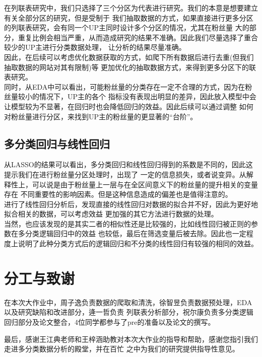 \documentclass{ctexart}
\begin{document}
在列联表研究中，我们只选择了三个分区为代表进行研究。我们的本意是想要建立有关全部分区的研究，但是受制于
我们抽取数据的方式，如果直接进行更多分区的列联表研究，会有同一个UP主同时设计多个分区的情况，尤其在粉丝量
大的部分，重复比例会相当严重，从而造成研究的结果不准确。因此我们尽量选择了重合较少的UP主进行分类数据处理，
让分析的结果尽量准确。\\
\indent 因此，在后续可以考虑优化数据获取的方式，如爬下所有数据后进行去重(但我们抽取数据的网站对其有限制)等
更加优化的抽取数据方式，来得到更多分区下的联表研究。\\
\indent 同时，从EDA中可以看出，可能粉丝量的分类存在一定不合理的方式，因为在粉丝量较小的情况下，UP主的各个
指标没有表现出明显的差异，因此放入模型中会让模型较为不显著，在回归时也会降低回归的效益。因此后续可以通过调整
如何对粉丝量进行分区，来找到UP主的粉丝量的更显著的“台阶”。

\subsection{多分类回归与线性回归}
从LASSO的结果可以看出，多分类回归和线性回归得到的系数是不同的，因此这提示我们在进行粉丝量分区处理时，出现了
一定的信息损失，或者说变异。从解释性上，可以说是由于粉丝量上一层与在全区间意义下的粉丝量的提升相关的变量存在
不同重要性的影响因素。但是这种信息造成的偏差也是值得注意的。\\
\indent 进行了线性回归分析后，发现直接的线性回归对数据的拟合并不好，因此为更好地拟合相关的数据，可以考虑效益
更加强的其它方法进行数据的处理。\\
\indent 当然，也应该发现的是其实二者的相似性还是比较强的，比如线性回归被正则的参数在多分类逻辑回归中的效益
也较低，最后在筛选变量后被去除。因此也一定程度上说明了此种分类方式后的逻辑回归和不分类的线性回归有较强的相同的效益。

\section*{分工与致谢}

在本次大作业中，周子逸负责数据的爬取和清洗，徐智昱负责数据预处理，EDA以及研究缺陷和改进部分，逄一哲负责
列联表分析部分，祝尔康负责多分类逻辑回归部分及论文整合，4位同学都参与了pre的准备以及论文的撰写。

最后，感谢王江典老师和王梓涵助教对本次大作业的指导和帮助，感谢您指引我们走进多分类数据分析的殿堂，并在百忙
之中为我们的研究提供指导性意见。
\end{document}
